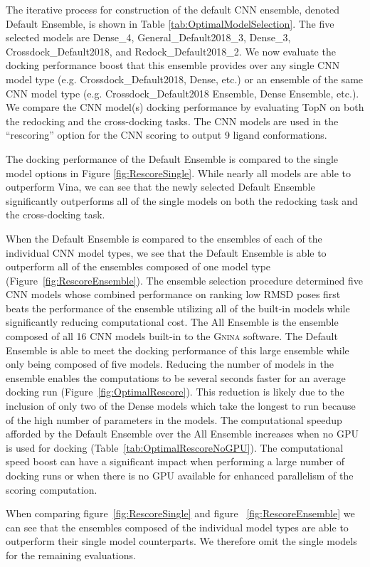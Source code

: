 \documentclass[journal=jcisd8,manuscript=article]{achemso}
\begin{document}
The iterative process for construction of the default CNN ensemble, denoted Default Ensemble, is shown in Table \ref{tab:OptimalModelSelection}. The five selected models are Dense\_4, General\_Default2018\_3, Dense\_3, Crossdock\_Default2018, and Redock\_Default2018\_2. We now evaluate the docking performance boost that this ensemble provides over any single CNN model type (e.g. Crossdock\_Default2018, Dense, etc.) or an ensemble of the same CNN model type (e.g. Crossdock\_Default2018 Ensemble, Dense Ensemble, etc.). We compare the CNN model(s) docking performance by evaluating TopN on both the redocking and the cross-docking tasks. The CNN models are used in the ``rescoring'' option for the CNN scoring to output 9 ligand conformations. 

The docking performance of the Default Ensemble is compared to the single model options in Figure \ref{fig:RescoreSingle}. While nearly all models are able to outperform Vina, we can see that the newly selected Default Ensemble significantly outperforms all of the single models on both the redocking task and the cross-docking task.

When the Default Ensemble is compared to the ensembles of each of the individual CNN model types, we see that the Default Ensemble is able to outperform all of the ensembles composed of one model type (Figure~\ref{fig:RescoreEnsemble}). The ensemble selection procedure determined five CNN models whose combined performance on ranking low RMSD poses first beats the performance of the ensemble utilizing all of the built-in models while significantly reducing computational cost. The All Ensemble is the ensemble composed of all 16 CNN models built-in to the \textsc{Gnina} software. The Default Ensemble is able to meet the docking performance of this large ensemble while only being composed of five models. Reducing the number of models in the ensemble enables the computations to be several seconds faster for an average docking run (Figure~\ref{fig:OptimalRescore}). This reduction is likely due to the inclusion of only two of the Dense models which take the longest to run because of the high number of parameters in the models. The computational speedup afforded by the Default Ensemble over the All Ensemble increases when no GPU is used for docking (Table~\ref{tab:OptimalRescoreNoGPU}). The computational speed boost can have a significant impact when performing a large number of docking runs or when there is no GPU available for enhanced parallelism of the scoring computation.

When comparing figure~\ref{fig:RescoreSingle} and figure ~\ref{fig:RescoreEnsemble} we can see that the ensembles composed of the individual model types are able to outperform their single model counterparts. We therefore omit the single models for the remaining evaluations.
\end{document}
